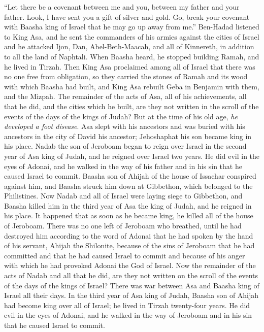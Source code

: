 \begin{biblechapter}
\verse “Let there be a covenant between me and you, between my father and your father. Look, I have sent you a gift of silver and gold. Go, break your covenant with Baasha king of Israel that he may go up away from me.”
\verse Ben-Hadad listened to King Asa, and he sent the commanders of his armies against the cities of Israel and he attacked Ijon, Dan, Abel-Beth-Maacah, and all of Kinnereth, in addition to all the land of Naphtali.
\verse When Baasha heard, he stopped building Ramah, and he lived in Tirzah.
\verse Then King Asa proclaimed among all of Israel that there was no one free from obligation, so they carried the stones of Ramah and its wood with which Baasha had built, and King Asa rebuilt Geba in Benjamin with them, and the Mizpah.
\verse The remainder of the acts of Asa, all of his achievements, all that he did, and the cities which he built, are they not written in the scroll of the events of the days of the kings of Judah? But at the time of his old age, \textit{he developed a foot disease}.
\verse Asa slept with his ancestors and was buried with his ancestors in the city of David his ancestor; Jehoshaphat his son became king in his place.
 Nadab the son of Jeroboam began to reign over Israel in the second year of Asa king of Judah, and he reigned over Israel two years.
\verse He did evil in the eyes of Adonai, and he walked in the way of his father and in his sin that he caused Israel to commit.
\verse Baasha son of Ahijah of the house of Issachar conspired against him, and Baasha struck him down at Gibbethon, which belonged to the Philistines. Now Nadab and all of Israel were laying siege to Gibbethon,
\verse and Baasha killed him in the third year of Asa the king of Judah, and he reigned in his place.
\verse It happened that as soon as he became king, he killed all of the house of Jeroboam. There was no one left of Jeroboam who breathed, until he had destroyed him according to the word of Adonai that he had spoken by the hand of his servant, Ahijah the Shilonite,
\verse because of the sins of Jeroboam that he had committed and that he had caused Israel to commit and because of his anger with which he had provoked Adonai the God of Israel.
\verse Now the remainder of the acts of Nadab and all that he did, are they not written on the scroll of the events of the days of the kings of Israel?
 There was war between Asa and Baasha king of Israel all their days.
\verse In the third year of Asa king of Judah, Baasha son of Ahijah had become king over all of Israel; he lived in Tirzah twenty-four years.
\verse He did evil in the eyes of Adonai, and he walked in the way of Jeroboam and in his sin that he caused Israel to commit.
\end{biblechapter}

